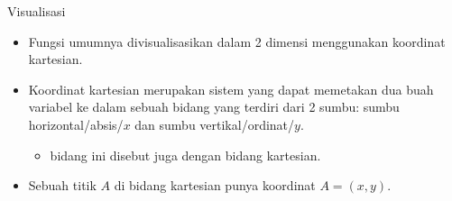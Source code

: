 \documentclass[
  ignorenonframetext,
]{beamer}
\providecommand{\tightlist}{%
  \setlength{\itemsep}{0pt}\setlength{\parskip}{0pt}}\usepackage{longtable,booktabs,array}
\begin{document}
\begin{frame}{Visualisasi}
\label{visualisasi}
\begin{itemize}
\item
  Fungsi umumnya divisualisasikan dalam 2 dimensi menggunakan koordinat
  kartesian.
\item
  Koordinat kartesian merupakan sistem yang dapat memetakan dua buah
  variabel ke dalam sebuah bidang yang terdiri dari 2 sumbu: sumbu
  horizontal/absis/\(x\) dan sumbu vertikal/ordinat/\(y\).

  \begin{itemize}
  \tightlist
  \item
    bidang ini disebut juga dengan bidang kartesian.
  \end{itemize}
\item
  Sebuah titik \(A\) di bidang kartesian punya koordinat \(A=(x,y)\).
\end{itemize}
\end{frame}
\end{document}
